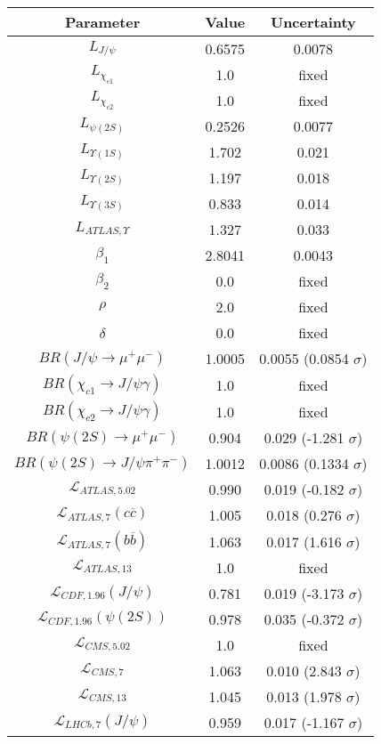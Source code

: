 \begin{table}[h!]
\centering
\begin{tabular}{c|c|c}
Parameter & Value & Uncertainty \\
\hline
$L_{J/\psi}$ & 0.6575 & 0.0078 \\
$L_{\chi_{c1}}$ & 1.0 & fixed \\
$L_{\chi_{c2}}$ & 1.0 & fixed \\
$L_{\psi(2S)}$ & 0.2526 & 0.0077 \\
$L_{\Upsilon(1S)}$ & 1.702 & 0.021 \\
$L_{\Upsilon(2S)}$ & 1.197 & 0.018 \\
$L_{\Upsilon(3S)}$ & 0.833 & 0.014 \\
$L_{ATLAS,\Upsilon}$ & 1.327 & 0.033 \\
$\beta_1$ & 2.8041 & 0.0043 \\
$\beta_2$ & 0.0 & fixed \\
$\rho$ & 2.0 & fixed \\
$\delta$ & 0.0 & fixed \\
$BR(J/\psi\rightarrow\mu^+\mu^-)$ & 1.0005 & 0.0055 (0.0854 $\sigma$) \\
$BR(\chi_{c1}\rightarrow J/\psi\gamma)$ & 1.0 & fixed \\
$BR(\chi_{c2}\rightarrow J/\psi\gamma)$ & 1.0 & fixed \\
$BR(\psi(2S)\rightarrow\mu^+\mu^-)$ & 0.904 & 0.029 (-1.281 $\sigma$) \\
$BR(\psi(2S)\rightarrow J/\psi\pi^+\pi^-)$ & 1.0012 & 0.0086 (0.1334 $\sigma$) \\
$\mathcal L_{ATLAS,5.02}$ & 0.990 & 0.019 (-0.182 $\sigma$) \\
$\mathcal L_{ATLAS,7}(c\overline c)$ & 1.005 & 0.018 (0.276 $\sigma$) \\
$\mathcal L_{ATLAS,7}(b\overline b)$ & 1.063 & 0.017 (1.616 $\sigma$) \\
$\mathcal L_{ATLAS,13}$ & 1.0 & fixed \\
$\mathcal L_{CDF,1.96}(J/\psi)$ & 0.781 & 0.019 (-3.173 $\sigma$) \\
$\mathcal L_{CDF,1.96}(\psi(2S))$ & 0.978 & 0.035 (-0.372 $\sigma$) \\
$\mathcal L_{CMS,5.02}$ & 1.0 & fixed \\
$\mathcal L_{CMS,7}$ & 1.063 & 0.010 (2.843 $\sigma$) \\
$\mathcal L_{CMS,13}$ & 1.045 & 0.013 (1.978 $\sigma$) \\
$\mathcal L_{LHCb,7}(J/\psi)$ & 0.959 & 0.017 (-1.167 $\sigma$) \\

\end{tabular}
\end{table}
